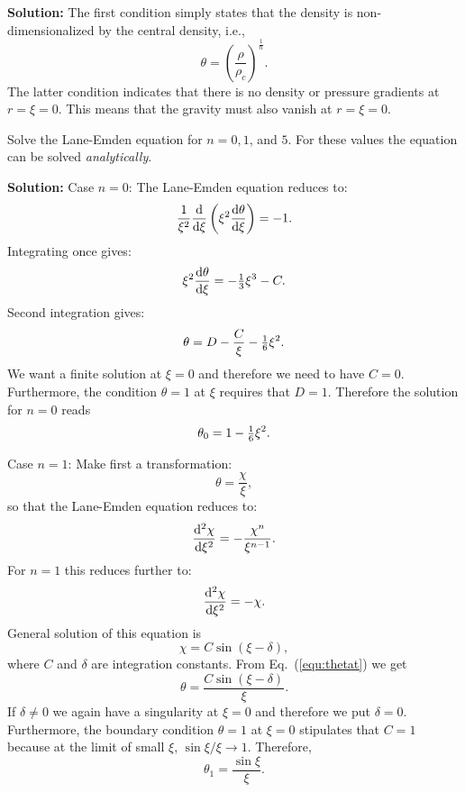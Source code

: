 \documentclass[12pt]{article}
\def\onethird{{\textstyle{1\over3}}}
\def\onesixth{{\textstyle{1\over6}}}
\def\dd{{\rm d}}
\begin{document}
{\bf Solution:} The first condition simply states that the density is
non-dimensionalized by the central density, i.e.,
\begin{equation}
\theta = \left(\frac{\rho}{\rho_c}\right)^{\frac{1}{n}}.
\end{equation}
The latter condition indicates that there is no density or pressure
gradients at $r=\xi=0$. This means that the gravity must also vanish
at $r=\xi=0$.


Solve the Lane-Emden equation for $n=0,1$, and $5$. For these values
the equation can be solved \emph{analytically}.

{\bf Solution:} Case $n=0$: The Lane-Emden equation reduces to:
\begin{eqnarray}
 \frac{1}{\xi^2} \frac{\dd}{\dd\xi}\left(\xi^2 \frac{\dd\theta}{\dd\xi} \right) = -1.
\end{eqnarray}
Integrating once gives:
\begin{eqnarray}
 \xi^2 \frac{\dd\theta}{\dd\xi} = -\onethird \xi^3 - C.
\end{eqnarray}
Second integration gives:
\begin{eqnarray}
 \theta = D - \frac{C}{\xi} - \onesixth \xi^2.
\end{eqnarray}
We want a finite solution at $\xi=0$ and therefore we need to have
$C=0$. Furthermore, the condition $\theta=1$ at $\xi$ requires that $D
=1$. Therefore the solution for $n=0$ reads
\begin{eqnarray}
 \theta_0 = 1 - \onesixth \xi^2.
\end{eqnarray}

\noindent
Case $n=1$: Make first a transformation:
\begin{equation}
  \theta = \frac{\chi}{\xi},\label{equ:thetat}
\end{equation}
so that the Lane-Emden equation reduces to:
\begin{equation}
\frac{\dd^2 \chi}{\dd \xi^2} = - \frac{\chi^n}{\xi^{n-1}}.
\end{equation}
For $n=1$ this reduces further to:
\begin{equation}
\frac{\dd^2 \chi}{\dd \xi^2} = - \chi.
\end{equation}
General solution of this equation is
\begin{equation}
\chi = C \sin(\xi - \delta),
\end{equation}
where $C$ and $\delta$ are integration constants. From
Eq.~(\ref{equ:thetat}) we get
\begin{equation}
\theta = \frac{C \sin(\xi - \delta)}{\xi}.
\end{equation}
If $\delta\neq 0$ we again have a singularity at $\xi=0$ and therefore
we put $\delta=0$. Furthermore, the boundary condition $\theta=1$ at
$\xi=0$ stipulates that $C=1$ because at the limit of small $\xi$,
$\sin\xi/\xi \longrightarrow 1$. Therefore,
\begin{equation}
\theta_1 = \frac{\sin\xi}{\xi}.
\end{equation}
\end{document}
